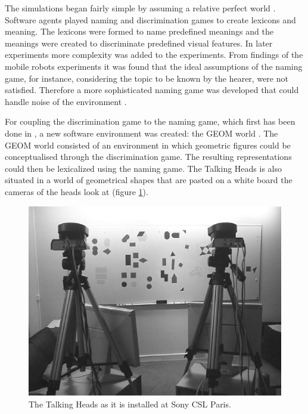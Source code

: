 The simulations began fairly simple by assuming a relative perfect world \citep{steels:1996a,steels:1996b}. Software agents played naming and discrimination games to create lexicons and meaning. The lexicons were formed to name predefined meanings and the meanings were created to discriminate predefined visual features. In later experiments more complexity was added to the experiments. From findings of the mobile robots experiments \citep{vogt:1998a} it was found that the ideal assumptions of the naming game, for instance, considering the topic to be known by the hearer, were not satisfied. Therefore a more sophisticated naming game was developed that could handle noise of the environment \citep{steelskaplan:1998}. 

For coupling the discrimination game to the naming game, which first has been done in \citep{steelsvogt:1997}, a new software environment was created: the GEOM world \citep{steels:2000}. The GEOM world consisted of an environment in which geometric figures could be conceptualised through the discrimination game. The resulting representations could then be lexicalized using the naming game. The Talking Heads is also situated in a world of geometrical shapes that are pasted on a white board the cameras of the heads look at (figure \ref{f:theory:talkingheads}).

\begin{figure}[t]
\centering
\includegraphics[width=12cm]{theory/th.eps}
\caption{The Talking Heads as it is installed at Sony CSL Paris.}
\label{f:theory:talkingheads}
\end{figure}

